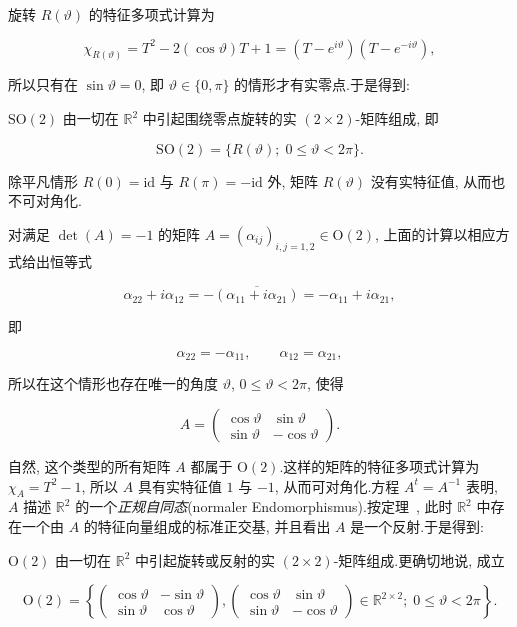 旋转 $R(\vartheta)$ 的特征多项式计算为

\[
\chi_{R(\vartheta)} = T^2 - 2(\cos \vartheta) T + 1 = (T - e^{i\vartheta})(T - e^{-i\vartheta}),
\]

所以只有在 $\sin \vartheta = 0$, 即 $\vartheta \in \{0, \pi\}$ 的情形才有实零点.于是得到:

\begin{theorem}\label{thm:7.5.5}
$\mathrm{SO}(2)$ 由一切在 $\mathbb{R}^2$ 中引起围绕零点旋转的实 $(2 \times 2)$-矩阵组成, 即

\[
\mathrm{SO}(2) = \bigl\{R(\vartheta);\; 0 \leq \vartheta < 2\pi\bigr\}\text{.}
\]
\end{theorem}

除平凡情形 $R(0) = \mathrm{id}$ 与 $R(\pi) = -\mathrm{id}$ 外, 矩阵 $R(\vartheta)$ 没有实特征值, 从而也不可对角化.

对满足 $\det(A) = -1$ 的矩阵 $A = (\alpha_{ij})_{i, j = 1, 2} \in \mathrm{O}(2)$, 上面的计算以相应方式给出恒等式

\[
\alpha_{22} + i\alpha_{12} = -\overline{(\alpha_{11} + i\alpha_{21})} = -\alpha_{11} + i\alpha_{21},
\]

即

\[
\alpha_{22} = -\alpha_{11}, \qquad \alpha_{12} = \alpha_{21},
\]

所以在这个情形也存在唯一的角度 $\vartheta$, $0 \leq \vartheta < 2\pi$, 使得

\[
A = \begin{pmatrix} \cos \vartheta & \sin \vartheta \\ \sin \vartheta & -\cos \vartheta \end{pmatrix}\text{.}
\]

自然, 这个类型的所有矩阵 $A$ 都属于 $\mathrm{O}(2)$.这样的矩阵的特征多项式计算为 $\chi_A = T^2 - 1$, 所以 $A$ 具有实特征值 $1$ 与 $-1$, 从而可对角化.方程 $A^t = A^{-1}$ 表明, $A$ 描述 $\mathbb{R}^2$ 的一个\emph{正规自同态}(\textup{normaler Endomorphismus}).按定理~, 此时 $\mathbb{R}^2$ 中存在一个由 $A$ 的特征向量组成的标准正交基, 并且看出 $A$ 是一个反射.于是得到:

\begin{theorem}\label{thm:7.5.6}
$\mathrm{O}(2)$ 由一切在 $\mathbb{R}^2$ 中引起旋转或反射的实 $(2 \times 2)$-矩阵组成.更确切地说, 成立

\[
\mathrm{O}(2) = \left\{\begin{pmatrix} \cos \vartheta & -\sin \vartheta \\ \sin \vartheta & \cos \vartheta \end{pmatrix}, \begin{pmatrix} \cos \vartheta & \sin \vartheta \\ \sin \vartheta & -\cos \vartheta \end{pmatrix} \in \mathbb{R}^{2 \times 2};\; 0 \leq \vartheta < 2\pi\right\}\text{.}
\]
\end{theorem}

